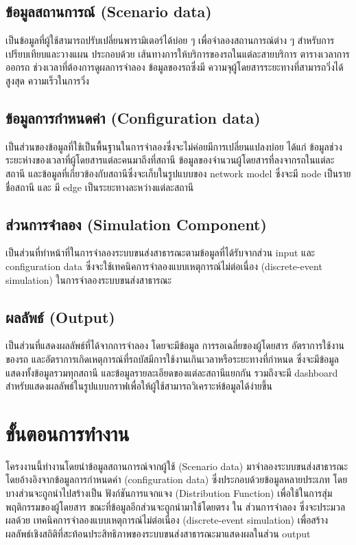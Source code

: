 \subsection{ข้อมูลสถานการณ์ (Scenario data)}
\begin{mypara}
  \indent เป็นข้อมูลที่ผู้ใช้สามารถปรับเปลี่ยนพารามิเตอร์ได้บ่อย ๆ เพื่อจำลองสถานการณ์ต่าง ๆ 
  สำหรับการเปรียบเทียบและวางแผน ประกอบด้วย เส้นทางการให้บริการของรถในแต่ละสายบริการ 
  ตารางเวลาการออกรถ ช่วงเวลาที่ต้องการดูผลการจําลอง ข้อมูลของรถซึ่งมี 
  ความจุผู้โดยสารระยะทางที่สามารถวิ่งได้สูงสุด ความเร็วในการวิ่ง
\end{mypara}
\subsection{ข้อมูลการกำหนดค่า (Configuration data)}
\begin{mypara}
  \indent เป็นส่วนของข้อมูลที่ใช้เป็นพื้นฐานในการจำลองซึ่งจะไม่ค่อยมีการเปลี่ยนแปลงบ่อย 
  ได้แก่ ข้อมูลช่วงระยะห่างของเวลาที่ผู้โดยสารแต่ละคนมาถึงที่สถานี ข้อมูลของจำนวนผู้โดยสารที่ลงจากรถในแต่ละสถานี 
  และข้อมูลที่เกี่ยวข้องกับสถานีซึ่งจะเก็บในรูปแบบของ network model ซึ่งจะมี 
  node เป็นรายชื่อสถานี และ มี edge เป็นระยะทางละหว่างแต่ละสถานี
  \end{mypara}
\subsection{ส่วนการจำลอง (Simulation Component)}
\begin{mypara}
  \indent เป็นส่วนที่ทำหน้าที่ในการจำลองระบบขนส่งสาธารณะตามข้อมูลที่ได้รับจากส่วน input 
  และ configuration data ซึ่งจะใช้เทคนิคการจำลองแบบเหตุการณ์ไม่ต่อเนื่อง (discrete-event simulation) 
  ในการจำลองระบบขนส่งสาธารณะ 
\end{mypara}
\subsection{ผลลัพธ์ (Output)}
\begin{mypara}
  \indent เป็นส่วนที่แสดงผลลัพธ์ที่ได้จากการจำลอง โดยจะมีข้อมูล การรอเฉลี่ยของผู้โดยสาร อัตราการใช้งานของรถ 
  และอัตราการเกิดเหตุการณ์ที่รถบัสมีการใช้งานเกินเวลาหรือระยะทางที่กำหนด
  ซึ่งจะมีข้อมูลแสดงทั้งข้อมูลรวมทุกสถานี และข้อมูลรายละเอียดของแต่ละสถานีแยกกัน รวมถึงจะมี dashboard 
  สำหรับแสดงผลลัพธ์ในรูปแบบกราฟเพื่อให้ผู้ใช้สามารถวิเคราะห์ข้อมูลได้ง่ายขึ้น
\end{mypara}
\section{ ขั้นตอนการทำงาน}
\begin{mypara}
    \indent โครงงานนี้ทำงานโดยนำข้อมูลสถานการณ์จากผู้ใช้ (Scenario data) มาจำลองระบบขนส่งสาธารณะ 
    โดยอ้างอิงจากข้อมูลการกำหนดค่า (configuration data) ซึ่งประกอบด้วยข้อมูลหลายประเภท 
    โดยบางส่วนจะถูกนำไปสร้างเป็น ฟังก์ชันการแจกแจง (Distribution Function) เพื่อใช้ในการสุ่มพฤติกรรมของผู้โดยสาร 
    ขณะที่ข้อมูลอีกส่วนจะถูกนำมาใช้โดยตรง ใน ส่วนการจำลอง ซึ่งจะประมวลผลด้วย
    เทคนิคการจำลองแบบเหตุการณ์ไม่ต่อเนื่อง (discrete-event simulation) 
    เพื่อสร้างผลลัพธ์เชิงสถิติที่สะท้อนประสิทธิภาพของระบบขนส่งสาธารณะมาแสดงผลในส่วน output
\end{mypara}


